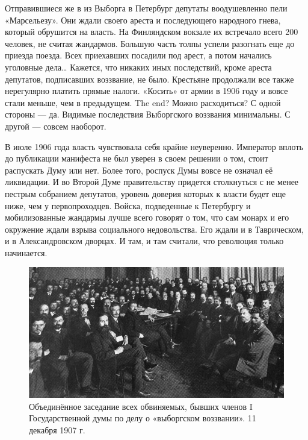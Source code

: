 Отправившиеся же в из Выборга в Петербург депутаты воодушевленно пели «Марсельезу». Они ждали своего ареста и последующего народного гнева, который обрушится на власть. На Финляндском вокзале их встречало всего 200 человек, не считая жандармов. Большую часть толпы успели разогнать еще до приезда поезда. Всех приехавших посадили под арест, а потом начались уголовные дела…
Кажется, что никаких иных последствий, кроме ареста депутатов, подписавших воззвание, не было. Крестьяне продолжали все также нерегулярно платить прямые налоги. «Косить» от армии в 1906 году и вовсе стали меньше, чем в предыдущем. The end? Можно расходиться?
С одной стороны — да. Видимые последствия Выборгского воззвания минимальны. С другой — совсем наоборот.

В июле 1906 года власть чувствовала себя крайне неуверенно. Император вплоть до публикации манифеста не был уверен в своем решении о том, стоит распускать Думу или нет. Более того, роспуск Думы вовсе не означал её ликвидации. И во Второй Думе правительству придется столкнуться с не менее пестрым собранием депутатов, уровень доверия которых к власти будет еще ниже, чем у первопроходцев. Войска, подведенные к Петербургу и мобилизованные жандармы лучше всего говорят о том, что сам монарх и его окружение ждали взрыва социального недовольства. Его ждали и в Таврическом, и в Александровском дворцах. И там, и там считали, что революция только начинается.


\begin{figure}[h!tb] 
	\centering\includegraphics[scale=0.5]{Vozzvanie/qBWuVrrcLWg.jpg}
	\caption{Объединённое заседание всех обвиняемых, бывших членов I Государственной думы по делу о «выборгском воззвании». 11 декабря 1907 г.
	}%
\end{figure}

